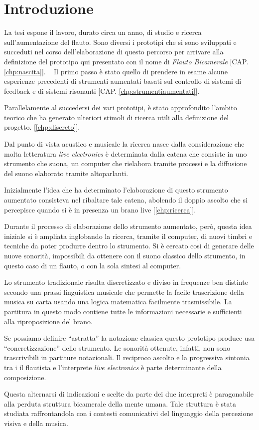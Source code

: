 
\chapter*{Introduzione}
\label{chp:introduzione}

La tesi espone il lavoro, durato circa un anno, di studio e ricerca
sull'aumentazione del flauto. Sono diversi i prototipi che si sono sviluppati e
succeduti nel corso dell’elaborazione di questo percorso per arrivare alla
definizione del prototipo qui presentato con il nome di \emph{Flauto Bicamerale}
[CAP. \ref{chp:nascita}].
 
Il primo passo è stato quello di prendere in esame alcune esperienze precedenti
di strumenti aumentati basati sul controllo di sistemi di feedback e di sistemi
risonanti [CAP. \ref{chp:strumentiaumentati}].

Parallelamente al succedersi dei vari prototipi, è stato approfondito l’ambito
teorico che ha generato ulteriori stimoli  di ricerca utili  alla definizione
del progetto. [\ref{chp:discreto}].

Dal punto di vista acustico e musicale la ricerca nasce dalla considerazione che
molta letteratura \emph{live electronics} è determinata dalla catena che consiste
in uno strumento che suona, un computer che rielabora tramite processi e la
diffusione del suono elaborato tramite altoparlanti.

Inizialmente l’idea che ha determinato l’elaborazione di questo strumento
aumentato consisteva nel ribaltare tale catena, abolendo il doppio ascolto che
si percepisce quando si è in presenza un brano live [\ref{chp:ricerca}].

Durante il processo di elaborazione dello strumento aumentato, però, questa idea
iniziale si è ampliata inglobando la ricerca, tramite il computer, di nuovi
timbri e tecniche da poter produrre dentro lo strumento. Si è cercato così di
generare delle nuove sonorità, impossibili da ottenere con il suono classico
dello strumento, in questo caso di un flauto, o con la sola sintesi al computer.

Lo strumento tradizionale risulta discretizzato e diviso in frequenze ben
distinte secondo una prassi linguistica musicale che permette la facile
trascrizione della musica su carta usando una logica matematica facilmente
trasmissibile. La partitura in questo modo contiene tutte le informazioni
necessarie e sufficienti alla riproposizione del brano.

Se possiamo definire “astratta” la notazione classica questo prototipo produce
usa “concretizzazione” dello strumento. Le sonorità ottenute, infatti, non sono
trascrivibili in partiture notazionali. Il reciproco ascolto e la progressiva
sintonia tra i il flautista e l’interprete \emph{live electronics} è parte determinante
della composizione.

Questa alternarsi di indicazioni e scelte da parte dei due interpreti è
paragonabile alla perduta struttura bicamerale della mente umana. Tale struttura
è stata studiata raffrontandola con i contesti comunicativi del linguaggio della
percezione visiva e della musica.

